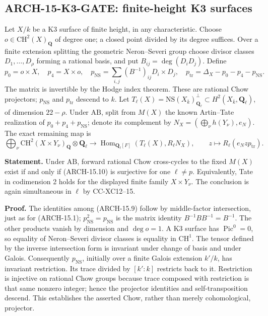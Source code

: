 \subsection{ARCH-15-K3-GATE: finite-height K3 surfaces}

Let \(X/k\) be a K3 surface of finite height, in any characteristic.
Choose \(o\in\mathrm{CH}^2(X)_{\mathbf Q}\) of degree one; a closed
point divided by its degree suffices. Over a finite extension splitting
the geometric Neron--Severi group choose divisor classes
\(D_1,\ldots,D_\rho\) forming a rational basis, and put
\(B_{ij}=\deg(D_iD_j)\). Define
\[
 p_0=o\times X,\quad p_4=X\times o,\quad
 p_{\mathrm{NS}}=\sum_{i,j}(B^{-1})_{ij}D_i\times D_j,
 \quad p_{\mathrm{tr}}=\Delta_X-p_0-p_4-p_{\mathrm{NS}}.
 \tag{ARCH-15.9}
\]
The matrix is invertible by the Hodge index theorem. These are rational
Chow projectors; \(p_{\mathrm{NS}}\) and \(p_{\mathrm{tr}}\) descend to
\(k\). Let \(T_\ell(X)=\mathrm{NS}(X_{\bar k})_{\mathbf Q_\ell}^{\perp}
\subset H^2(X_{\bar k},\mathbf Q_\ell)\), of dimension \(22-\rho\).
Under \(\mathrm{AB}\), split from \(M(X)\) the known Artin--Tate
realization of \(p_0+p_4+p_{\mathrm{NS}}\); denote its complement by
\(N_X=(\bigoplus_\nu h(Y_\nu),e_N)\). The exact remaining map is
\[
 \bigoplus_\nu\mathrm{CH}^2(X\times Y_\nu)_{\mathbf Q}
       \otimes\mathbf Q_\ell
 \longrightarrow
 \operatorname{Hom}_{\mathbf Q_\ell[F]}(T_\ell(X),R_\ell N_X),
 \qquad z\longmapsto R_\ell(e_Nzp_{\mathrm{tr}}).
 \tag{ARCH-15.10}
\]

\textbf{Statement.} Under \(\mathrm{AB}\), forward rational Chow
cross-cycles to the fixed \(M(X)\) exist if and only if (ARCH-15.10) is
surjective for one \(\ell\ne p\). Equivalently, Tate in codimension 2
holds for the displayed finite family \(X\times Y_\nu\). The
conclusion is again simultaneous in \(\ell\) by CC-XC12--15.

\textbf{Proof.} The identities among (ARCH-15.9) follow by middle-factor
intersection, just as for (ARCH-15.1); \(p_{\mathrm{NS}}^2=p_{\mathrm{NS}}\)
is the matrix identity \(B^{-1}BB^{-1}=B^{-1}\). The other products
vanish by dimension and \(\deg o=1\). A K3 surface has
\(\operatorname{Pic}^0=0\), so equality of Neron--Severi divisor classes
is equality in \(\mathrm{CH}^1\). The tensor defined by the inverse
intersection form is invariant under change of basis and under Galois.
Consequently \(p_{\mathrm{NS}}\), initially over a finite Galois
extension \(k'/k\), has invariant restriction. Its trace divided by
\([k':k]\) restricts back to it. Restriction is injective on rational
Chow groups because trace composed with restriction is that same
nonzero integer; hence the projector identities and self-transposition
descend. This establishes the asserted Chow, rather than merely
cohomological, projector.

